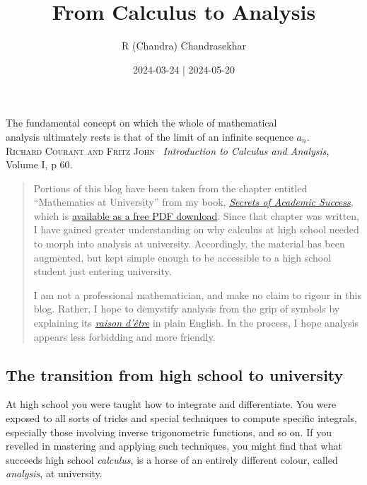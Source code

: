\documentclass[
  a4paper,
]{article}
\title{From Calculus to Analysis}
\author{R (Chandra) Chandrasekhar}
\date{2024-03-24 | 2024-05-20}
\begin{document}
\maketitle

\thispagestyle{empty}


\begin{flushright}

\begin{footnotesize}

The fundamental concept on which the whole of mathematical\\
analysis ultimately rests is that of the limit of an infinite sequence
\(a_{n}\).\\
\textsc{Richard Courant and Fritz John}~ \emph{Introduction to Calculus
and Analysis}, Volume I, p 60.

\end{footnotesize}

\end{flushright}

\begin{quote}
Portions of this blog have been taken from the chapter entitled
``Mathematics at University'' from my book,
\href{https://swanlotus.netlify.app/sas}{\emph{Secrets of Academic
Success}}, which is
\href{https://swanlotus.netlify.app/sas-manuscript/SAS-partial.pdf}{available
as a free PDF download}. Since that chapter was written, I have gained
greater understanding on why calculus at high school needed to morph
into analysis at university. Accordingly, the material has been
augmented, but kept simple enough to be accessible to a high school
student just entering university.

I am not a professional mathematician, and make no claim to rigour in
this blog. Rather, I hope to demystify analysis from the grip of symbols
by explaining its
\href{https://www.thefreedictionary.com/raison+d+etre}{\emph{raison
d'être}} in plain English. In the process, I hope analysis appears less
forbidding and more friendly.
\end{quote}

\subsection{The transition from high school to
university}\label{the-transition-from-high-school-to-university}

At high school you were taught how to integrate and differentiate. You
were exposed to all sorts of tricks and special techniques to compute
specific integrals, especially those involving inverse trigonometric
functions, and so on. If you revelled in mastering and applying such
techniques, you might find that what succeeds high school
\emph{calculus}, is a horse of an entirely different colour, called
\emph{analysis}, at university.
\end{document}

